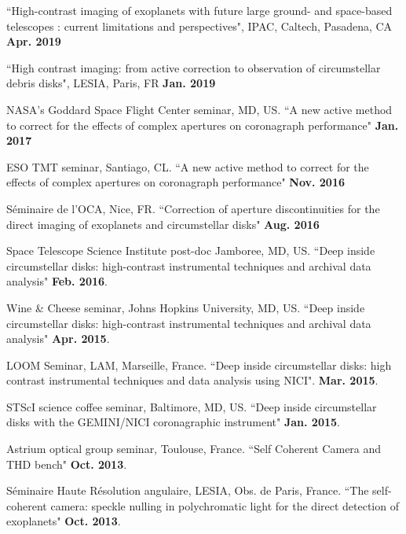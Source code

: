 \documentclass[12pt]{article}
\begin{document}
\begin{etaremune}
\item ``High-contrast imaging of exoplanets with future large ground- and space-based telescopes : current limitations and perspectives", IPAC, Caltech, Pasadena, CA \textbf{Apr. 2019}

\item ``High contrast imaging: from active correction to observation of circumstellar debris disks", LESIA, Paris, FR \textbf{Jan. 2019}

\item NASA's Goddard Space Flight Center seminar, MD, US. ``A new active method to correct for the effects of complex apertures on coronagraph performance" \textbf{Jan. 2017}

\item ESO TMT seminar, Santiago, CL. ``A new active method to correct for the effects of complex apertures on coronagraph performance" \textbf{Nov. 2016}

\item Séminaire de l'OCA, Nice, FR. ``Correction of aperture discontinuities for the direct imaging of exoplanets and circumstellar disks" \textbf{Aug. 2016}

\item Space Telescope Science Institute post-doc Jamboree, MD, US. ``Deep inside circumstellar disks: high-contrast instrumental techniques and archival data analysis" \textbf{Feb. 2016}.

\item Wine \& Cheese seminar, Johns Hopkins University, MD, US. ``Deep inside circumstellar disks: high-contrast instrumental techniques and archival data analysis" \textbf{Apr. 2015}.

\item LOOM Seminar, LAM, Marseille, France. ``Deep inside circumstellar disks: high contrast instrumental techniques and data analysis using NICI". \textbf{Mar. 2015}.

\item STScI science coffee seminar, Baltimore, MD, US. ``Deep inside circumstellar disks with the GEMINI/NICI coronagraphic instrument"  \textbf{Jan. 2015}.

\item Astrium optical group seminar, Toulouse, France. ``Self Coherent Camera and THD bench"  \textbf{Oct. 2013}.

\item Séminaire Haute Résolution angulaire, LESIA, Obs. de Paris, France. ``The self-coherent camera: speckle nulling in polychromatic light for the direct detection of exoplanets" \textbf{Oct. 2013}.


\end{etaremune}
\end{document}
